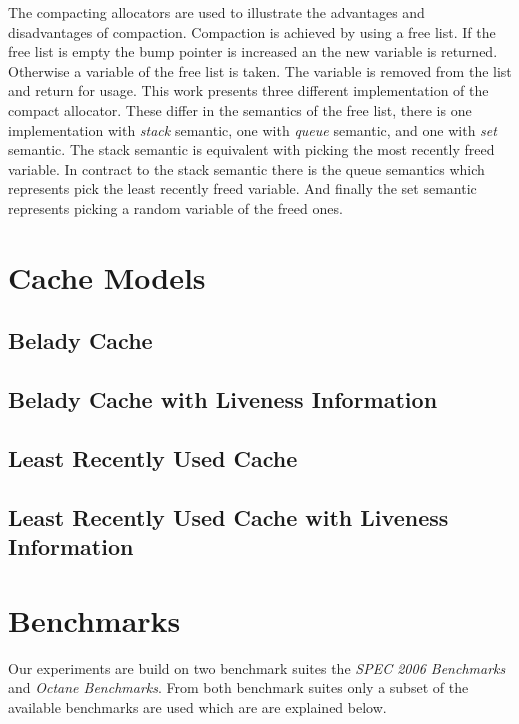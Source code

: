 \documentclass[onecolumn, openright, master, english, signatures]{dbrgrptt}
\begin{document}
The compacting allocators are used to illustrate the advantages and disadvantages of compaction. Compaction is achieved by using a free list. If the free list is empty the bump pointer is increased an the new variable is returned. Otherwise a variable of the free list is taken. The variable is removed from the list and return for usage. This work presents three different implementation of the compact allocator. These differ in the semantics of the free list, there is one implementation with \emph{stack} semantic, one with \emph{queue} semantic, and one with \emph{set} semantic. The stack semantic is equivalent with picking the most recently freed variable. In contract to the stack semantic there is the queue semantics which represents pick the least recently freed variable. And finally the set semantic represents picking a random variable of the freed ones.

\section{Cache Models}\label{sec:cache-models}
\subsection{Belady Cache}\label{ssec:cache-belady}
\subsection{Belady Cache with Liveness Information}\label{ssec:cache-belady-liveness}
\subsection{Least Recently Used Cache}\label{ssec:cache-lru}
\subsection{Least Recently Used Cache with Liveness Information}\label{ssec:cache-lru-liveness}



\section{Benchmarks}\label{sec:benchmarks}

Our experiments are build on two benchmark suites the \emph{SPEC 2006 Benchmarks}\cite{henning2006spec} and \emph{Octane Benchmarks}\cite{v8benchmarks}. From both benchmark suites only a subset of the available benchmarks are used which are are explained below.
\end{document}
